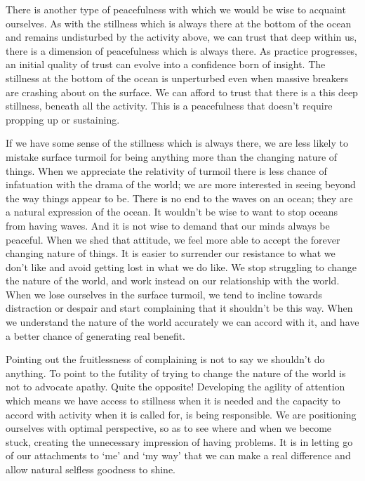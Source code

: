 There is another type of peacefulness with which we would be wise to
acquaint ourselves. As with the stillness which is always there at the
bottom of the ocean and remains undisturbed by the activity above, we
can trust that deep within us, there is a dimension of peacefulness
which is always there. As practice progresses, an initial quality of
trust can evolve into a confidence born of insight. The stillness at the
bottom of the ocean is unperturbed even when massive breakers are
crashing about on the surface. We can afford to trust that there is a
this deep stillness, beneath all the activity. This is a peacefulness
that doesn’t require propping up or sustaining.

If we have some sense of the stillness which is always there, we are
less likely to mistake surface turmoil for being anything more than the
changing nature of things. When we appreciate the relativity of turmoil
there is less chance of infatuation with the drama of the world; we are
more interested in seeing beyond the way things appear to be. There is
no end to the waves on an ocean; they are a natural expression of the
ocean. It wouldn’t be wise to want to stop oceans from having waves. And
it is not wise to demand that our minds always be peaceful. When we shed
that attitude, we feel more able to accept the forever changing nature
of things. It is easier to surrender our resistance to what we don’t
like and avoid getting lost in what we do like. We stop struggling to
change the nature of the world, and work instead on our relationship
with the world. When we lose ourselves in the surface turmoil, we tend
to incline towards distraction or despair and start complaining that it
shouldn’t be this way. When we understand the nature of the world
accurately we can accord with it, and have a better chance of generating
real benefit.

Pointing out the fruitlessness of complaining is not to say we shouldn’t
do anything. To point to the futility of trying to change the nature of
the world is not to advocate apathy. Quite the opposite! Developing the
agility of attention which means we have access to stillness when it is
needed and the capacity to accord with activity when it is called for,
is being responsible. We are positioning ourselves with optimal
perspective, so as to see where and when we become stuck, creating the
unnecessary impression of having problems. It is in letting go of our
attachments to ‘me’ and ‘my way’ that we can make a real difference and
allow natural selfless goodness to shine.


